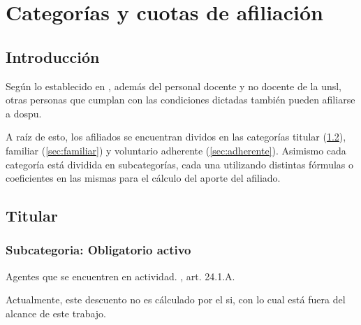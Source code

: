 \chapter{Categorías y cuotas de afiliación}



\section{Introducción}
Según lo establecido en \cite{dospuOrd53}, además del personal docente y no docente de la \acrfull{unsl}, otras personas que cumplan con las condiciones dictadas también pueden afiliarse a \acrshort{dospu}.

A raíz de esto, los afiliados se encuentran dividos en las categorías titular (\cref{sec:titular}), familiar (\cref{sec:familiar}) y voluntario adherente (\cref{sec:adherente}). Asimismo cada categoría está dividida en subcategorías, cada una utilizando distintas fórmulas o coeficientes en las mismas para el cálculo del aporte del afiliado.

\section{Titular} \label{sec:titular}

\subsection{Subcategoria: Obligatorio activo}
\begin{displayquote}
Agentes que se encuentren en actividad.
\hfill\parencite{dospuOrd53}, art. 24.1.A.
\end{displayquote}

Actualmente, este descuento no es cálculado por el \acrshort{si}, con lo cual está fuera del alcance de este trabajo.

